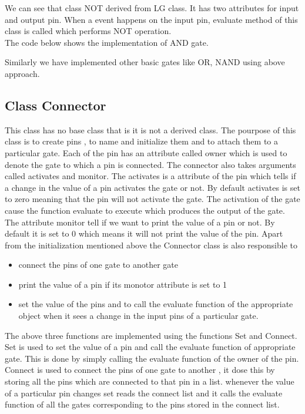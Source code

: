 \documentclass[a4paper,12pt]{article}
\begin{document}


We can see that class NOT derived from LG class. It has two attributes for input and output pin. 
When a event happens on the input pin, evaluate method of this class is called which performs NOT operation.\\

The code below shows the implementation of AND gate.


Similarly we have implemented other basic gates like OR, NAND using above approach.

\subsection{Class Connector}
This class has no base class that is it is not a derived class. The pourpose of this class is to create pins , to name and initialize them and to attach them to a particular gate. Each of the pin has an attribute called owner which is used to denote the gate to which a pin is connected. The connector also takes arguments called activates and monitor. The activates is a attribute of the pin which tells if a change in the value of a pin activates the gate or not. By default activates is set to zero meaning that the pin will not activate the gate. The activation of the gate cause the function evaluate to execute which produces the output of the gate. The attribute monitor tell if we want to print the value of a pin or not. By default it is set to 0 which means it will not print the value of the pin. Apart from the initialization mentioned above the Connector class is also responsible to
\begin{itemize}
 \item connect the pins of one gate to another gate 
 \item print the value of a pin if its monotor attribute is set to 1 
\item set the value of the pins and to call the evaluate function of the appropriate object when it sees a change in the input pins of a particular gate.
\end{itemize}
The above three functions are implemented using the functions Set and Connect. Set is used to set the value of a pin and call the evaluate function of appropriate gate. This is done by simply calling the evaluate function of the owner of the pin. Connect is used to connect the pins of one gate to another , it dose this by storing all the pins which are connected to that pin in a list. whenever the value of a  particular pin changes set reads the connect list and it calls the evaluate function of all the gates corresponding to the pins stored in the connect list. \\
\end{document}
